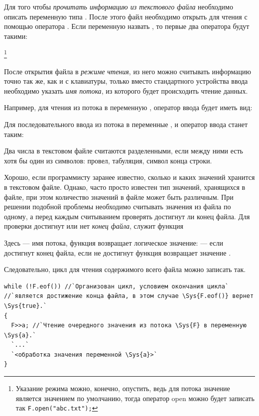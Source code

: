 Для того чтобы \emph{прочитать информацию из текстового файла}
необходимо описать переменную типа . После этого файл необходимо открыть для чтения с
помощью оператора . Если переменную назвать , то первые два оператора будут
такими:


\footnote{Указание режима  можно, конечно, опустить,
ведь для потока  значение  является значением по умолчанию, тогда 
оператор open можно будет записать так \lstinline!F.open("abc.txt");!}

После открытия файла в \emph{режиме чтения}, из него можно считывать информацию точно так же, как и с
клавиатуры, только вместо стандартного устройства ввода  необходимо указать
\emph{имя потока}, из которого будет происходить чтение данных.

Например, для чтения из потока  в переменную , оператор ввода будет иметь вид:


Для последовательного ввода из потока  в переменные ,  и
 оператор ввода станет таким:


Два числа в текстовом файле считаются разделенными, если между ними есть хотя бы один из символов: провел, табуляция,
символ конца строки.

Хорошо, если программисту заранее известно, сколько и каких значений хранится в текстовом файле. Однако, часто просто
известен тип значений, хранящихся в файле, при этом количество значений в файле может быть различным. При решении
подобной проблемы необходимо считывать значения из файла по одному, а перед каждым считыванием проверять достигнут ли
конец файла. Для проверки достигнут или нет \emph{конец файла}, служит функция 


Здесь  --- имя потока, функция возвращает логическое значение:  --- если
достигнут конец файла, если не достигнут функция возвращает значение .

Следовательно, цикл для чтения содержимого всего файла можно записать так.
\begin{lstlisting}
while (!F.eof()) //`Организован цикл, условием окончания цикла`
//`является достижение конца файла, в этом случае \Sys{F.eof()} вернет \Sys{true}.`
{
  F>>a;	//`Чтение очередного значения из потока \Sys{F} в переменную \Sys{a}.`
  `...`
  `<обработка значения переменной \Sys{a}>`
}
\end{lstlisting}

